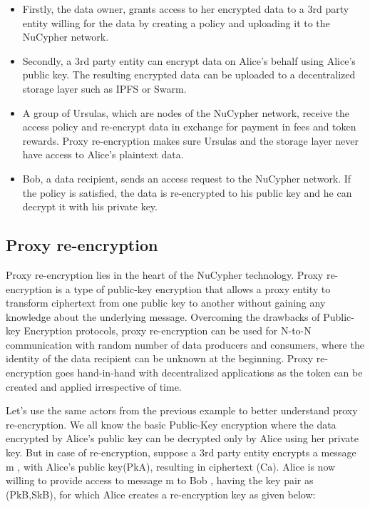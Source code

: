 \documentclass[12pt]{article}
\begin{document}
\begin{itemize}


 \item Firstly, the data owner, grants access to her encrypted data to a 3rd party entity willing for the data by creating a policy and uploading it to the NuCypher network. 
 \item Secondly, a 3rd party entity can encrypt data on Alice’s behalf using Alice’s public key. The resulting encrypted data can be uploaded to a decentralized storage layer such as IPFS or Swarm. 
 \item A group of Ursulas, which are nodes of the NuCypher network, receive the access policy and re-encrypt data in exchange for payment in fees and token rewards. Proxy re-encryption makes  sure Ursulas and the storage layer never have access to Alice’s plaintext data.
 \item Bob, a data recipient, sends an access request to the NuCypher network. If the policy is satisfied, the data is re-encrypted to his public key and he can decrypt it with his private key.

\end{itemize}

\subsection{Proxy re-encryption}
Proxy re-encryption lies in the heart of the NuCypher technology. Proxy re-encryption is a type of public-key encryption that allows a proxy entity to transform ciphertext from one public key to another without gaining any knowledge about the underlying message. Overcoming the drawbacks of Public-key Encryption protocols, proxy re-encryption can be used for N-to-N communication with random number of data producers and consumers, where the identity of the data recipient can be unknown at the beginning. Proxy re-encryption goes hand-in-hand with decentralized applications as the token can be created and applied irrespective of time.

\bigskip

 Let’s use the same actors from the previous example to better understand proxy re-encryption. We all know the basic Public-Key encryption where the data encrypted by Alice’s public key can be decrypted only by Alice using her private key. But in case of re-encryption, suppose a 3rd party entity encrypts a 	message m , with Alice’s public key(PkA), resulting in ciphertext (Ca). Alice is now willing to provide access to message m to Bob , having the key pair as (PkB,SkB), for which Alice creates a re-encryption key as given below:
\end{document}
